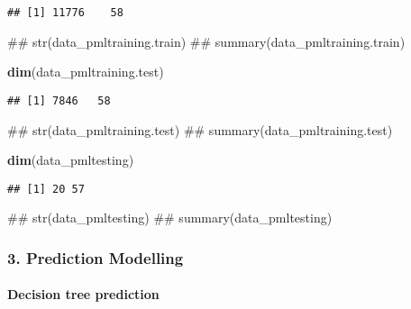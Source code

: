 \documentclass[]{article}
\newenvironment{Shaded}{\begin{snugshade}}{\end{snugshade}}
\newcommand{\KeywordTok}[1]{\textcolor[rgb]{0.13,0.29,0.53}{\textbf{{#1}}}}
\newcommand{\NormalTok}[1]{{#1}}
\begin{document}
\begin{verbatim}
## [1] 11776    58
\end{verbatim}

\begin{Shaded}
\begin{Highlighting}[]
\NormalTok{## str(data_pmltraining.train)}
\NormalTok{## summary(data_pmltraining.train)}
\end{Highlighting}
\end{Shaded}

\begin{Shaded}
\begin{Highlighting}[]
\KeywordTok{dim}\NormalTok{(data_pmltraining.test)}
\end{Highlighting}
\end{Shaded}

\begin{verbatim}
## [1] 7846   58
\end{verbatim}

\begin{Shaded}
\begin{Highlighting}[]
\NormalTok{## str(data_pmltraining.test)}
\NormalTok{## summary(data_pmltraining.test)}
\end{Highlighting}
\end{Shaded}

\begin{Shaded}
\begin{Highlighting}[]
\KeywordTok{dim}\NormalTok{(data_pmltesting)}
\end{Highlighting}
\end{Shaded}

\begin{verbatim}
## [1] 20 57
\end{verbatim}

\begin{Shaded}
\begin{Highlighting}[]
\NormalTok{## str(data_pmltesting)}
\NormalTok{## summary(data_pmltesting)}
\end{Highlighting}
\end{Shaded}

\subsubsection{3. Prediction Modelling}\label{prediction-modelling}

\paragraph{Decision tree prediction}\label{decision-tree-prediction}
\end{document}
